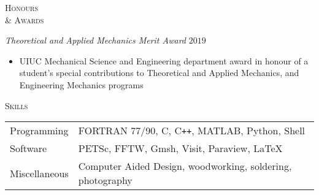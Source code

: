 \documentclass[10pt]{article}
\begin{document}
\vspace{-1.5em} 
\begin{multicols}{2}
\textsc{Honours \\ \& Awards}
\columnbreak

\textit{Theoretical and Applied Mechanics Merit Award} \hfill $2019$

\vspace{-1.75em}
\begin{itemize}[label= ]
    \setlength{\itemindent}{-1.50em}
    \item[]  UIUC Mechanical Science and Engineering department award in honour of a student's special contributions to Theoretical and Applied Mechanics, and Engineering Mechanics programs
\end{itemize}
\vspace{-2.0em}

\end{multicols}
\vspace{-1.5em}
\begin{multicols}{2}
\textsc{Skills}
\columnbreak

\begin {table}[H]
\begin{tabular}{l l }
\hspace{-0.5em}Programming   & \hspace{-0.0em} FORTRAN 77/90, C, C\texttt{++}, MATLAB, Python, Shell\\
\hspace{-0.5em}Software      & \hspace{-0.0em} PETSc, FFTW, Gmsh, Visit, Paraview, \LaTeX\\
\hspace{-0.5em}Miscellaneous & \hspace{-0.0em} Computer Aided Design, woodworking, soldering, photography \\
\end{tabular}	
\end{table}

\end{multicols}
\vspace{-1.5em}
\end{document}
